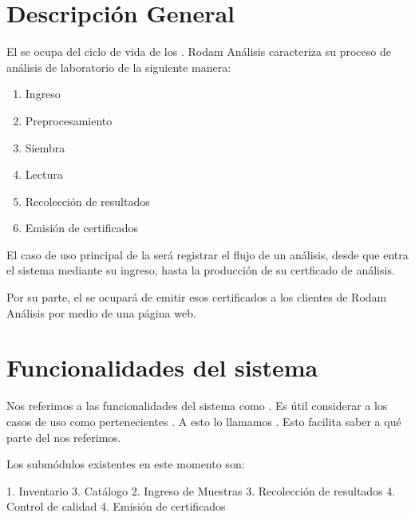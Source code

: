 \documentclass[letterpaper,10pt,spanish]{sphinxmanual}
\begin{document}
\section{Descripción General}
\label{\detokenize{requerimientos/srs:descripcion-general}}
El  se ocupa del ciclo de vida de los .  Rodam Análisis caracteriza su proceso de análisis de laboratorio
de la siguiente manera:
\begin{enumerate}
%
\item {} 
Ingreso

\item {} 
Preprocesamiento

\item {} 
Siembra

\item {} 
Lectura

\item {} 
Recolección de resultados

\item {} 
Emisión de certificados

\end{enumerate}

El caso de uso principal de la  será
registrar el flujo de un análisis, desde
que entra el sistema mediante su ingreso, hasta la producción de su
certficado de análisis.

Por su parte, el  se ocupará de emitir esos certificados
a los clientes de Rodam Análisis por medio de una página web.


\section{Funcionalidades del sistema}
\label{\detokenize{requerimientos/srs:funcionalidades-del-sistema}}
Nos referimos a las funcionalidades del sistema como .
Es útil considerar a los casos de uso como pertenecientes . A
esto lo llamamos . Esto facilita
saber a qué parte del  nos referimos.

Los submódulos existentes en este momento son:

1. Inventario
3. Catálogo
2. Ingreso de Muestras
3. Recolección de resultados
4. Control de calidad
4. Emisión de certificados
\end{document}
